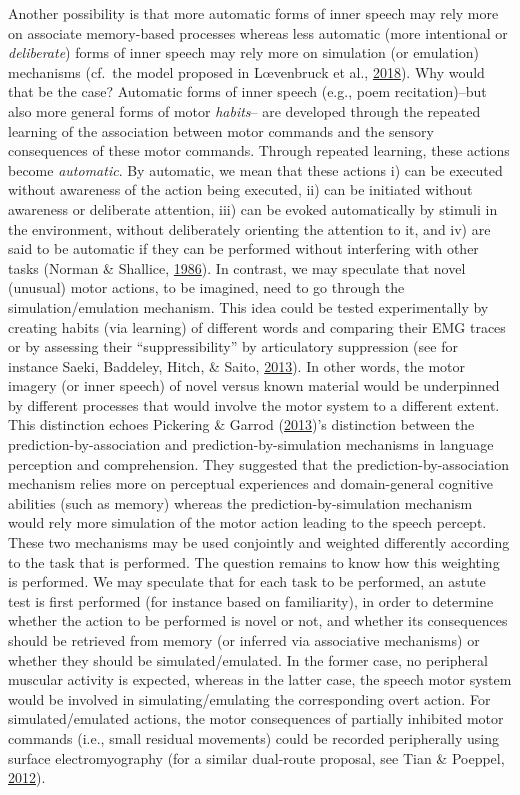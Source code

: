 \documentclass[a4paper,12pt,twoside,onecolumn,openright,final,oldfontcommands]{memoir}
\begin{document}
Another possibility is that more automatic forms of inner speech may rely more on associate memory-based processes whereas less automatic (more intentional or \emph{deliberate}) forms of inner speech may rely more on simulation (or emulation) mechanisms (cf.~the model proposed in Lœvenbruck et al., \protect\hyperlink{ref-loevenbruck_cognitive_2018}{2018}). Why would that be the case? Automatic forms of inner speech (e.g., poem recitation)--but also more general forms of motor \emph{habits}-- are developed through the repeated learning of the association between motor commands and the sensory consequences of these motor commands. Through repeated learning, these actions become \emph{automatic}. By automatic, we mean that these actions i) can be executed without awareness of the action being executed, ii) can be initiated without awareness or deliberate attention, iii) can be evoked automatically by stimuli in the environment, without deliberately orienting the attention to it, and iv) are said to be automatic if they can be performed without interfering with other tasks (Norman \& Shallice, \protect\hyperlink{ref-norman_attention_1986}{1986}). In contrast, we may speculate that novel (unusual) motor actions, to be imagined, need to go through the simulation/emulation mechanism. This idea could be tested experimentally by creating habits (via learning) of different words and comparing their EMG traces or by assessing their \enquote{suppressibility} by articulatory suppression (see for instance Saeki, Baddeley, Hitch, \& Saito, \protect\hyperlink{ref-saeki_breaking_2013}{2013}). In other words, the motor imagery (or inner speech) of novel versus known material would be underpinned by different processes that would involve the motor system to a different extent. This distinction echoes Pickering \& Garrod (\protect\hyperlink{ref-pickering_integrated_2013}{2013})'s distinction between the prediction-by-association and prediction-by-simulation mechanisms in language perception and comprehension. They suggested that the prediction-by-association mechanism relies more on perceptual experiences and domain-general cognitive abilities (such as memory) whereas the prediction-by-simulation mechanism would rely more simulation of the motor action leading to the speech percept. These two mechanisms may be used conjointly and weighted differently according to the task that is performed. The question remains to know how this weighting is performed. We may speculate that for each task to be performed, an astute test is first performed (for instance based on familiarity), in order to determine whether the action to be performed is novel or not, and whether its consequences should be retrieved from memory (or inferred via associative mechanisms) or whether they should be simulated/emulated. In the former case, no peripheral muscular activity is expected, whereas in the latter case, the speech motor system would be involved in simulating/emulating the corresponding overt action. For simulated/emulated actions, the motor consequences of partially inhibited motor commands (i.e., small residual movements) could be recorded peripherally using surface electromyography (for a similar dual-route proposal, see Tian \& Poeppel, \protect\hyperlink{ref-tian_mental_2012}{2012}).
\end{document}
